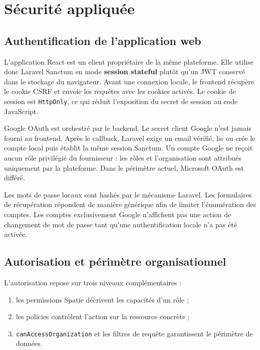 \section{Sécurité appliquée}

\subsection{Authentification de l'application web}

L'application React est un client propriétaire de la même plateforme. Elle utilise
donc Laravel Sanctum en mode \textbf{session stateful} plutôt qu'un JWT conservé dans
le stockage du navigateur. Avant une connexion locale, le frontend récupère le
cookie CSRF et envoie les requêtes avec les cookies activés. Le cookie de session est
\texttt{HttpOnly}, ce qui réduit l'exposition du secret de session au code
JavaScript.

Google OAuth est orchestré par le backend. Le secret client Google n'est jamais
fourni au frontend. Après le callback, Laravel exige un email vérifié, lie ou crée le
compte local puis établit la même session Sanctum. Un compte Google ne reçoit aucun
rôle privilégié du fournisseur : les rôles et l'organisation sont attribués
uniquement par la plateforme. Dans le périmètre actuel, Microsoft OAuth est différé.

Les mots de passe locaux sont hashés par le mécanisme Laravel. Les formulaires de
récupération répondent de manière générique afin de limiter l'énumération des
comptes. Les comptes exclusivement Google n'affichent pas une action de changement
de mot de passe tant qu'une authentification locale n'a pas été activée.

\subsection{Autorisation et périmètre organisationnel}

L'autorisation repose sur trois niveaux complémentaires :

\begin{enumerate}[leftmargin=8mm]
  \item les permissions Spatie décrivent les capacités d'un rôle ;
  \item les policies contrôlent l'action sur la ressource concrète ;
  \item \texttt{canAccessOrganization} et les filtres de requête garantissent le
  périmètre de données.
\end{enumerate}

